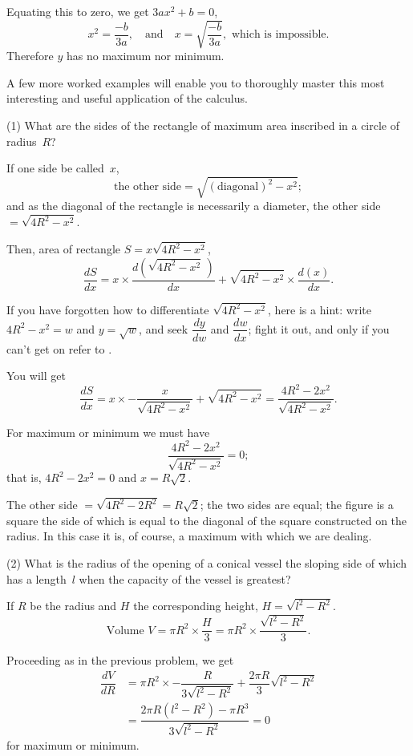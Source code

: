 \documentclass[12pt]{book}[2005/09/16]
\newcommand{\DPPageSep}[2]{\Pagelabel{#2}}
\newcommand{\Pagelabel}[1]
  {\phantomsection\label{#1}}
\newcommand{\Pageref}[2][p.]{%
  \ifthenelse{\not\equal{#1}{}}{%
    \hyperref[#2]{#1~\pageref{#2}}%
  }{%
    \hyperref[#2]{\pageref{#2}}%
  }%
}
\newcommand{\DPnote}[1]{}%
\begin{document}
Equating this to zero, we get $3ax^2 + b = 0$,
\[
x^2 = \frac{-b}{3a}, \quad\text{and}\quad x = \sqrt{\frac{-b}{3a}},\text{ which is impossible.}
\]
Therefore $y$ has no maximum nor\DPnote{** TN: [sic]} minimum.

A few more worked examples will enable you to
thoroughly master this most interesting and useful
application of the calculus.

(1) What are the sides of the rectangle of maximum
area inscribed in a circle of radius~$R$?

If one side be called~$x$,
\[
\text{the other side} = \sqrt{(\text{diagonal})^2 - x^2};
\]
and as the diagonal of the rectangle is necessarily a
diameter, the other side~$ = \sqrt{4R^2 - x^2}$.

Then, area of rectangle $S = x\sqrt{4R^2 - x^2}$,
\[
\frac{dS}{dx} = x × \dfrac{d\left(\sqrt{4R^2 - x^2}\,\right)}{dx} + \sqrt{4R^2 - x^2} × \dfrac{d(x)}{dx}.
\]

If you have forgotten how to differentiate $\sqrt{4R^2-x^2}$,
here is a hint: write $4R^2-x^2=w$ and $y=\sqrt{w}$, and
seek $\dfrac{dy}{dw}$ and $\dfrac{dw}{dx}$; fight it out, and only if you can't
get on refer to \Pageref[page]{dodge}.
\DPPageSep{117.png}{105}%

You will get
\[
\dfrac{dS}{dx}
  = x × -\dfrac{x}{\sqrt{4R^2 - x^2}} + \sqrt{4R^2 - x^2}
  = \dfrac{4R^2 - 2x^2}{\sqrt{4R^2 - x^2}}.
\]

For maximum or minimum we must have
\[
\dfrac{4R^2 - 2x^2}{\sqrt{4R^2 - x^2}} = 0;
\]
that is, $4R^2 - 2x^2 = 0$ and $x = R\sqrt{2}$.

The other side ${} = \sqrt{4R^2 - 2R^2} = R\sqrt{2}$; the two sides
are equal; the figure is a square the side of which is
equal to the diagonal of the square constructed on the
radius. In this case it is, of course, a maximum with
which we are dealing.

(2) What is the radius of the opening of a conical
vessel the sloping side of which has a length~$l$ when
the capacity of the vessel is greatest?

If $R$ be the radius and $H$ the corresponding height,
$H = \sqrt{l^2 - R^2}$.
\[
\text{Volume } V = \pi R^2 × \dfrac{H}{3} = \pi R^2 × \dfrac{\sqrt{l^2 - R^2}}{3}.
\]

Proceeding as in the previous problem, we get
\begin{align*}
\dfrac{dV}{dR}
  &= \pi R^2 × -\dfrac{R}{3\sqrt{l^2 - R^2}} + \dfrac{2\pi R}{3} \sqrt{l^2 - R^2} \\
  &= \dfrac{2\pi R(l^2 - R^2) - \pi R^3}{3\sqrt{l^2 - R^2}} = 0
\end{align*}
for maximum or minimum.
\end{document}
